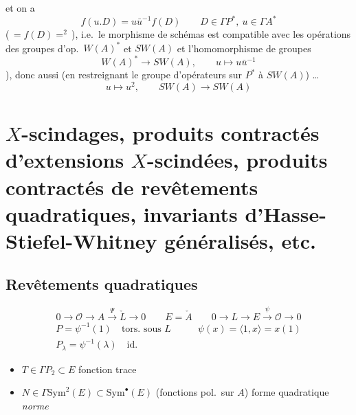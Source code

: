 \documentclass[11pt,a4paper]{article}
\begin{document}

et on a
\[
  f(u.D) = u\bar{u}^{-1} f(D) \qquad D \in \Gamma P^{*},\ u \in \Gamma A^{*}
\]
(\,$= f(D) =^{2}$\,), i.e.\ le morphisme de schémas est compatible avec les opérations des groupes d'op.\ $W(A)^{*}$ et $SW(A)$ et l'homomorphisme de groupes
\[
  W(A)^{*} \longrightarrow SW(A), \qquad u \longmapsto u\bar{u}^{-1}
\]
), donc aussi (en restreignant le groupe d'opérateurs sur $P^{*}$ à $SW(A)$) …
\[
  u \longmapsto u^{2}, \qquad SW(A) \longrightarrow SW(A)
\]

\section{$X$-scindages, produits contractés d'extensions $X$-scindées, produits contractés de revêtements quadratiques, invariants d'Hasse-Stiefel-Whitney généralisés, etc.}

\subsection{Revêtements quadratiques}

\[
  0 \to \mathcal{O} \to A \xrightarrow{\ \Psi\ } \check{L} \to 0
  \qquad E = \check{A}
  \qquad 0 \to L \to E \xrightarrow{\ \psi\ } \mathcal{O} \to 0
\]
\[
  \begin{array}{ll}
    P = \psi^{-1}(1) \quad \text{tors.\ sous } L \qquad & \psi(x) = \langle 1, x\rangle = x(1)\\[2pt]
    P_{\lambda} = \psi^{-1}(\lambda) \quad \text{id.} &
  \end{array}
\]
\begin{itemize}
  \item $T \in \Gamma P_{2} \subset E$ \quad fonction trace
  \item $N \in \Gamma \mathrm{Sym}^{2}(E) \subset \mathrm{Sym}^{\bullet}(E)$ (fonctions pol.\ sur $A$) \quad forme quadratique \emph{norme}
\end{itemize}
\end{document}

